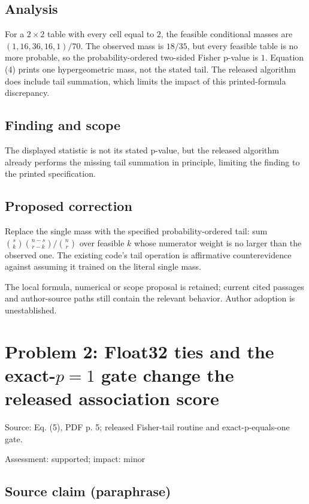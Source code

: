 \documentclass[11pt]{article}
\begin{document}
\subsection*{Analysis}

For a \(2\times2\) table with every cell equal to \(2\), the feasible conditional masses are \((1,16,36,16,1)/70\). The observed mass is \(18/35\), but every feasible table is no more probable, so the probability-ordered two-sided Fisher p-value is \(1\). Equation (4) prints one hypergeometric mass, not the stated tail. The released algorithm does include tail summation, which limits the impact of this printed-formula discrepancy.

\subsection*{Finding and scope}

The displayed statistic is not its stated p-value, but the released algorithm already performs the missing tail summation in principle, limiting the finding to the printed specification.

\subsection*{Proposed correction}

Replace the single mass with the specified probability-ordered tail: sum \(\binom{s}{k}\binom{n-s}{r-k}/\binom nr\) over feasible \(k\) whose numerator weight is no larger than the observed one. The existing code’s tail operation is affirmative counterevidence against assuming it trained on the literal single mass.

The local formula, numerical or scope proposal is retained; current cited passages and author-source paths still contain the relevant behavior. Author adoption is unestablished.

\section*{Problem 2: Float32 ties and the exact-\(p=1\) gate change the released association score}

Source: Eq. (5), PDF p. 5; released Fisher-tail routine and exact-p-equals-one gate.

Assessment: supported; impact: minor

\subsection*{Source claim (paraphrase)}
\end{document}
